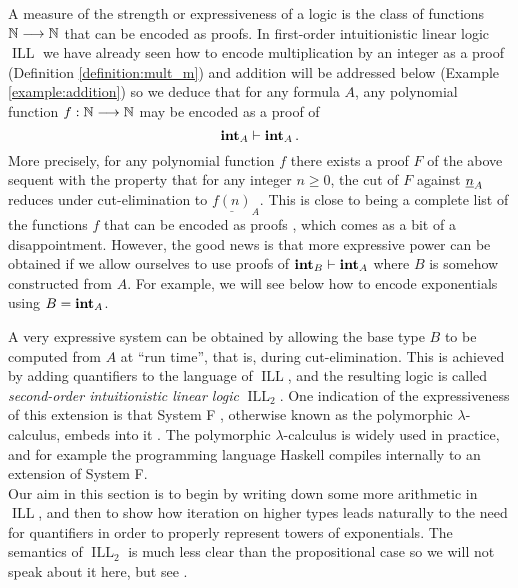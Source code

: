 \documentclass[english,letter paper,12pt,reqno]{article}
\theoremstyle{example}
\numberwithin{equation}{section}
\DeclareMathOperator{\ILL}{ILL}
\def\inta{\bold{int}}
\begin{document}
A measure of the strength or expressiveness of a logic is the class of functions $\mathbb{N} \longrightarrow \mathbb{N}$ that can be encoded as proofs. In first-order intuitionistic linear logic $\ILL$ we have already seen how to encode multiplication by an integer as a proof (Definition \ref{definition:mult_m}) and addition will be addressed below (Example \ref{example:addition}) so we deduce that for any formula $A$, any polynomial function $f: \mathbb{N} \longrightarrow \mathbb{N}$ may be encoded as a proof of
\[
\inta_A \vdash \inta_A\,.
\]
More precisely, for any polynomial function $f$ there exists a proof $F$ of the above sequent with the property that for any integer $n \ge 0$, the cut of $F$ against $\underline{n}_A$ reduces under cut-elimination to $\underline{f(n)}_A$. This is close to being a complete list of the functions $f$ that can be encoded as proofs \cite{schwicht}, which comes as a bit of a disappointment. However, the good news is that more expressive power can be obtained if we allow ourselves to use proofs of $\inta_B \vdash \inta_A$ where $B$ is somehow constructed from $A$. For example, we will see below how to encode exponentials using $B = \inta_A$. 

A very expressive system can be obtained by allowing the base type $B$ to be computed from $A$ at ``run time'', that is, during cut-elimination. This is achieved by adding quantifiers to the language of $\ILL$, and the resulting logic is called \emph{second-order intuitionistic linear logic} $\ILL_2$. One indication of the expressiveness of this extension is that System F \cite[\S 11]{girard_prooftypes}, otherwise known as the polymorphic $\lambda$-calculus, embeds into it \cite[\S 5.2]{girard_llogic}. The polymorphic $\lambda$-calculus is widely used in practice, and for example the programming language Haskell compiles internally to an extension of System F. 
\\


Our aim in this section is to begin by writing down some more arithmetic in $\ILL$, and then to show how iteration on higher types leads naturally to the need for quantifiers in order to properly represent towers of exponentials. The semantics of $\ILL_2$ is much less clear than the propositional case so we will not speak about it here, but see \cite{girard_systemf,seely_systemf, seely}.
\end{document}
